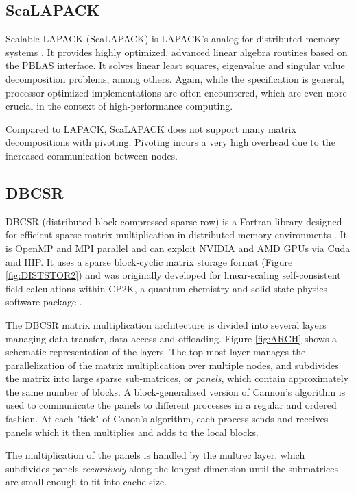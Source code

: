 \subsection{ScaLAPACK}

Scalable LAPACK (ScaLAPACK) is LAPACK's analog for distributed memory systems \cite{Sca2021}. It provides highly optimized, advanced linear algebra routines based on the PBLAS interface.  It solves linear least squares, eigenvalue and singular value decomposition problems, among others. Again, while the specification is general, processor optimized implementations are often encountered, which are even more crucial in the context of high-performance computing. 

Compared to LAPACK, ScaLAPACK does not support many matrix decompositions with pivoting. Pivoting incurs a very high overhead due to the increased communication between nodes.

\subsection{DBCSR}

DBCSR (distributed block compressed sparse row) is a Fortran library designed for efficient sparse matrix multiplication in distributed memory environments \cite{Bor2014,DBCSR2020}. It is OpenMP and MPI parallel and can exploit NVIDIA and AMD GPUs via Cuda and HIP. It uses a sparse block-cyclic matrix storage format (Figure \ref{fig:DISTSTOR2}) and was originally developed for linear-scaling self-consistent field calculations within CP2K, a quantum chemistry and solid state physics software package \cite{Hut2014,Sch2016}. 

The DBCSR matrix multiplication architecture is divided into several layers managing data transfer, data access and offloading. Figure \ref{fig:ARCH} shows a schematic representation of the layers. The top-most layer manages the parallelization of the matrix multiplication over multiple nodes, and subdivides the matrix into large sparse sub-matrices, or \emph{panels}, which contain approximately the same number of blocks. A block-generalized version of Cannon's algorithm \cite{Can1969} is used to communicate the panels to different processes in a regular and ordered fashion. At each "tick" of Canon's algorithm, each process  sends and receives panels which it then multiplies and adds to the local blocks. 

The multiplication of the panels is handled by the multrec layer, which subdivides panels \emph{recursively} along the longest dimension until the submatrices are small enough to fit into cache size.

